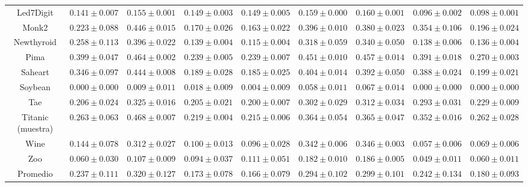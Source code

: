 \begin{landscape}
\begin{table}
{\begin{tabular}{|c|cccccccc|}
	Led7Digit & $0.141 \pm 0.007$ & $0.155 \pm 0.001$ & $0.149 \pm 0.003$ & $0.149 \pm 0.005$ & $0.159 \pm 0.000$ & $0.160 \pm 0.001$ & $0.096 \pm 0.002$ & $0.098 \pm 0.001$\\ 
	Monk2 & $0.223 \pm 0.088$ & $0.446 \pm 0.015$ & $0.170 \pm 0.026$ & $0.163 \pm 0.022$ & $0.396 \pm 0.010$ & $0.380 \pm 0.023$ & $0.354 \pm 0.106$ & $0.196 \pm 0.024$\\ 
	Newthyroid & $0.258 \pm 0.113$ & $0.396 \pm 0.022$ & $0.139 \pm 0.004$ & $0.115 \pm 0.004$ & $0.318 \pm 0.059$ & $0.340 \pm 0.050$ & $0.138 \pm 0.006$ & $0.136 \pm 0.004$\\ 
	Pima & $0.399 \pm 0.047$ & $0.464 \pm 0.002$ & $0.239 \pm 0.005$ & $0.239 \pm 0.007$ & $0.451 \pm 0.010$ & $0.457 \pm 0.014$ & $0.391 \pm 0.018$ & $0.270 \pm 0.003$\\ 
	Saheart & $0.346 \pm 0.097$ & $0.444 \pm 0.008$ & $0.189 \pm 0.028$ & $0.185 \pm 0.025$ & $0.404 \pm 0.014$ & $0.392 \pm 0.050$ & $0.388 \pm 0.024$ & $0.199 \pm 0.021$\\ 
	Soybean & $0.000 \pm 0.000$ & $0.009 \pm 0.011$ & $0.018 \pm 0.009$ & $0.004 \pm 0.009$ & $0.058 \pm 0.011$ & $0.067 \pm 0.014$ & $0.000 \pm 0.000$ & $0.000 \pm 0.000$\\ 
	Tae & $0.206 \pm 0.024$ & $0.325 \pm 0.016$ & $0.205 \pm 0.021$ & $0.200 \pm 0.007$ & $0.302 \pm 0.029$ & $0.312 \pm 0.034$ & $0.293 \pm 0.031$ & $0.229 \pm 0.009$\\ 
	Titanic (muestra) & $0.263 \pm 0.063$ & $0.468 \pm 0.007$ & $0.219 \pm 0.004$ & $0.215 \pm 0.006$ & $0.364 \pm 0.054$ & $0.365 \pm 0.047$ & $0.352 \pm 0.016$ & $0.262 \pm 0.028$\\ 
	Wine & $0.144 \pm 0.078$ & $0.312 \pm 0.027$ & $0.100 \pm 0.013$ & $0.096 \pm 0.028$ & $0.342 \pm 0.006$ & $0.346 \pm 0.003$ & $0.057 \pm 0.006$ & $0.069 \pm 0.006$\\ 
	Zoo & $0.060 \pm 0.030$ & $0.107 \pm 0.009$ & $0.094 \pm 0.037$ & $0.111 \pm 0.051$ & $0.182 \pm 0.010$ & $0.186 \pm 0.005$ & $0.049 \pm 0.011$ & $0.060 \pm 0.011$\\ 
	\hline
	Promedio & $0.237 \pm 0.111$ & $0.320 \pm 0.127$ & $0.173 \pm 0.078$ & $0.166 \pm 0.079$ & $0.294 \pm 0.102$ & $0.299 \pm 0.101$ & $0.242 \pm 0.134$ & $0.180 \pm 0.093$\\ 
	\hline
	\end{tabular}
}
\end{table}



\end{landscape}
